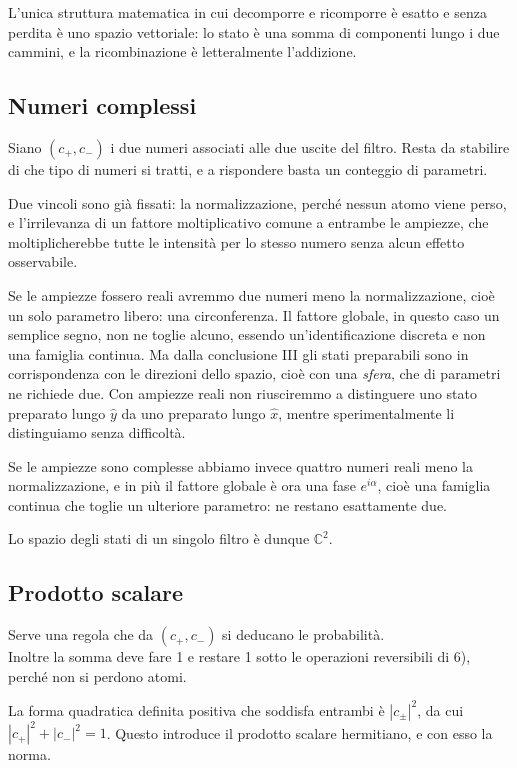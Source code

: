 L’unica struttura matematica in cui decomporre e ricomporre è esatto e senza perdita è uno spazio vettoriale: lo stato è una somma di componenti lungo i due cammini, e la ricombinazione è letteralmente l’addizione. 

\subsection*{Numeri complessi}

Siano $(c_+,c_-)$ i due numeri associati alle due uscite del filtro. Resta da stabilire di che tipo di numeri si tratti, e a rispondere basta un conteggio di parametri.

Due vincoli sono già fissati: la normalizzazione, perché nessun atomo viene perso, e l'irrilevanza di un fattore moltiplicativo comune a entrambe le ampiezze, che moltiplicherebbe tutte le intensità per lo stesso numero senza alcun effetto osservabile.

Se le ampiezze fossero reali avremmo due numeri meno la normalizzazione, cioè un solo parametro libero: una circonferenza. Il fattore globale, in questo caso un semplice segno, non ne toglie alcuno, essendo un'identificazione discreta e non una famiglia continua. Ma dalla conclusione III gli stati preparabili sono in corrispondenza con le direzioni dello spazio, cioè con una \emph{sfera}, che di parametri ne richiede due. Con ampiezze reali non riusciremmo a distinguere uno stato preparato lungo $\hat{y}$ da uno preparato lungo $\hat{x}$, mentre sperimentalmente li distinguiamo senza difficoltà.

Se le ampiezze sono complesse abbiamo invece quattro numeri reali meno la normalizzazione, e in più il fattore globale è ora una fase $e^{i\alpha}$, cioè una famiglia continua che toglie un ulteriore parametro: ne restano esattamente due.

Lo spazio degli stati di un singolo filtro è dunque $\mathbb{C}^2$.

\subsection*{Prodotto scalare}

Serve una regola che da $(c_+, c_-)$ si deducano le probabilità. \\ 
Inoltre la somma deve fare 1 e restare 1 sotto le operazioni reversibili di 6), perché non si perdono atomi.

La forma quadratica definita positiva che soddisfa entrambi è $|c_\pm|^2$, da cui $|c_+|^2+|c_-|^2=1$. Questo introduce il prodotto scalare hermitiano, e con esso la norma.

